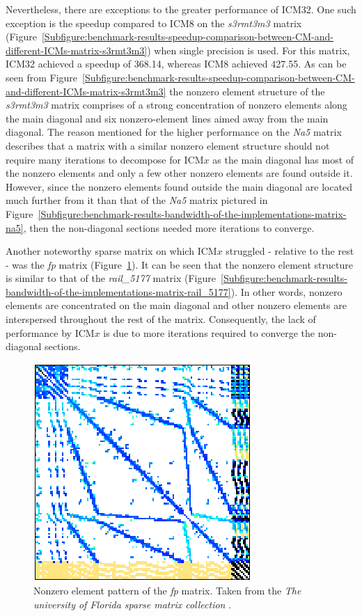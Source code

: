 Nevertheless, there are exceptions to the greater performance of ICM32. One such exception is the speedup compared to ICM8 on the \textit{s3rmt3m3} matrix (Figure~\ref{Subfigure:benchmark-results-speedup-comparison-between-CM-and-different-ICMs-matrix-s3rmt3m3}) when single precision is used. For this matrix, ICM32 achieved a speedup of 368.14, whereas ICM8 achieved 427.55. As can be seen from Figure~\ref{Subfigure:benchmark-results-speedup-comparison-between-CM-and-different-ICMs-matrix-s3rmt3m3} the nonzero element structure of the \textit{s3rmt3m3} matrix comprises of a strong concentration of nonzero elements along the main diagonal and six nonzero-element lines aimed away from the main diagonal. The reason mentioned for the higher performance on the \textit{Na5} matrix describes that a matrix with a similar nonzero element structure should not require many iterations to decompose for ICM$ x $ as the main diagonal has most of the nonzero elements and only a few other nonzero elements are found outside it. However, since the nonzero elements found outside the main diagonal are located much further from it than that of the \textit{Na5} matrix pictured in Figure~\ref{Subfigure:benchmark-results-bandwidth-of-the-implementations-matrix-na5}, then the non-diagonal sections needed more iterations to converge.
\par Another noteworthy sparse matrix on which ICM$ x $ struggled - relative to the rest - was the \textit{fp} matrix (Figure~\ref{Figure:benchmark-results-speedup-comparison-between-CM-and-different-ICMs-matrix-fp}). It can be seen that the nonzero element structure is similar to that of the \textit{rail\_5177} matrix (Figure~\ref{Subfigure:benchmark-results-bandwidth-of-the-implementations-matrix-rail_5177}). In other words, nonzero elements are concentrated on the main diagonal and other nonzero elements are interspersed throughout the rest of the matrix. Consequently, the lack of performance by ICM$ x $ is due to more iterations required to converge the non-diagonal sections.

\begin{figure}[ht!]
	\centering
	\includegraphics[width=.35\textwidth, keepaspectratio, clip]{images/ch3/matrices/fp.png}
	\caption{Nonzero element pattern of the \mbox{\textit{fp}} matrix. Taken from the \emph{The university of Florida sparse matrix collection} \cite{Davis2011}.}
	\label{Figure:benchmark-results-speedup-comparison-between-CM-and-different-ICMs-matrix-fp}
\end{figure}

